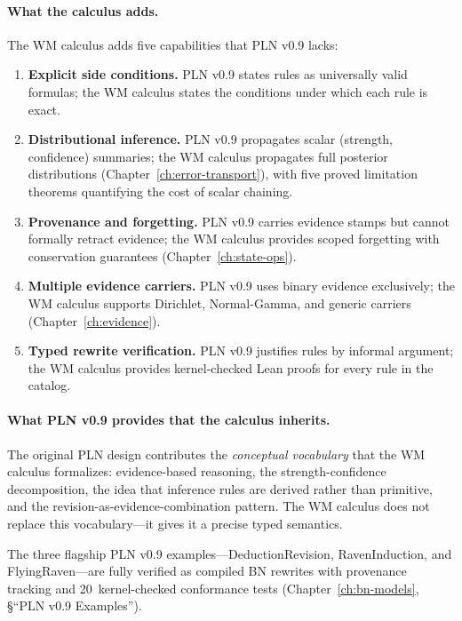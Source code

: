 \paragraph{What the calculus adds.}
The WM calculus adds five capabilities that PLN v0.9 lacks:
\begin{enumerate}
\item \textbf{Explicit side conditions.}  PLN v0.9 states rules as
  universally valid formulas; the WM calculus states the conditions
  under which each rule is exact.
\item \textbf{Distributional inference.}  PLN v0.9 propagates scalar
  (strength, confidence) summaries; the WM calculus propagates full
  posterior distributions (Chapter~\ref{ch:error-transport}), with
  five proved limitation theorems quantifying the cost of scalar
  chaining.
\item \textbf{Provenance and forgetting.}  PLN v0.9 carries evidence
  stamps but cannot formally retract evidence; the WM calculus
  provides scoped forgetting with conservation guarantees
  (Chapter~\ref{ch:state-ops}).
\item \textbf{Multiple evidence carriers.}  PLN v0.9 uses binary
  evidence exclusively; the WM calculus supports Dirichlet,
  Normal-Gamma, and generic carriers (Chapter~\ref{ch:evidence}).
\item \textbf{Typed rewrite verification.}  PLN v0.9 justifies rules
  by informal argument; the WM calculus provides kernel-checked Lean
  proofs for every rule in the catalog.
\end{enumerate}

\paragraph{What PLN v0.9 provides that the calculus inherits.}
The original PLN design contributes the \emph{conceptual vocabulary}
that the WM calculus formalizes: evidence-based reasoning, the
strength-confidence decomposition, the idea that inference rules are
derived rather than primitive, and the revision-as-evidence-combination
pattern.  The WM calculus does not replace this vocabulary---it gives
it a precise typed semantics.

\begin{remark}
The three flagship PLN v0.9 examples---DeductionRevision,
RavenInduction, and FlyingRaven---are fully verified as compiled
BN rewrites with provenance tracking and 20~kernel-checked
conformance tests (Chapter~\ref{ch:bn-models}, \S``PLN v0.9
Examples'').
\end{remark}



